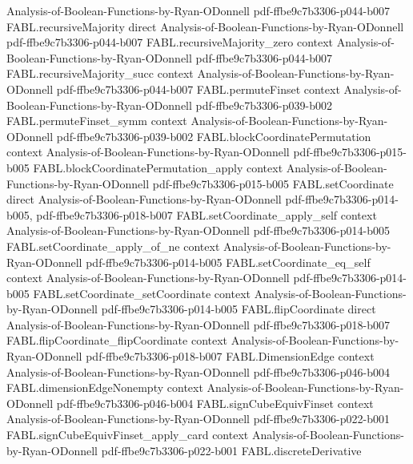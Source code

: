 \begin{theorem}
  {Analysis-of-Boolean-Functions-by-Ryan-ODonnell}
  {pdf-ffbe9c7b3306-p044-b007}
\proofstep
  {FABL.recursiveMajority}
  {direct}
  {Analysis-of-Boolean-Functions-by-Ryan-ODonnell}
  {pdf-ffbe9c7b3306-p044-b007}
\proofstep
  {FABL.recursiveMajority_zero}
  {context}
  {Analysis-of-Boolean-Functions-by-Ryan-ODonnell}
  {pdf-ffbe9c7b3306-p044-b007}
\proofstep
  {FABL.recursiveMajority_succ}
  {context}
  {Analysis-of-Boolean-Functions-by-Ryan-ODonnell}
  {pdf-ffbe9c7b3306-p044-b007}
\proofstep
  {FABL.permuteFinset}
  {context}
  {Analysis-of-Boolean-Functions-by-Ryan-ODonnell}
  {pdf-ffbe9c7b3306-p039-b002}
\proofstep
  {FABL.permuteFinset_symm}
  {context}
  {Analysis-of-Boolean-Functions-by-Ryan-ODonnell}
  {pdf-ffbe9c7b3306-p039-b002}
\proofstep
  {FABL.blockCoordinatePermutation}
  {context}
  {Analysis-of-Boolean-Functions-by-Ryan-ODonnell}
  {pdf-ffbe9c7b3306-p015-b005}
\proofstep
  {FABL.blockCoordinatePermutation_apply}
  {context}
  {Analysis-of-Boolean-Functions-by-Ryan-ODonnell}
  {pdf-ffbe9c7b3306-p015-b005}
\proofstep
  {FABL.setCoordinate}
  {direct}
  {Analysis-of-Boolean-Functions-by-Ryan-ODonnell}
  {pdf-ffbe9c7b3306-p014-b005,
    pdf-ffbe9c7b3306-p018-b007}
\proofstep
  {FABL.setCoordinate_apply_self}
  {context}
  {Analysis-of-Boolean-Functions-by-Ryan-ODonnell}
  {pdf-ffbe9c7b3306-p014-b005}
\proofstep
  {FABL.setCoordinate_apply_of_ne}
  {context}
  {Analysis-of-Boolean-Functions-by-Ryan-ODonnell}
  {pdf-ffbe9c7b3306-p014-b005}
\proofstep
  {FABL.setCoordinate_eq_self}
  {context}
  {Analysis-of-Boolean-Functions-by-Ryan-ODonnell}
  {pdf-ffbe9c7b3306-p014-b005}
\proofstep
  {FABL.setCoordinate_setCoordinate}
  {context}
  {Analysis-of-Boolean-Functions-by-Ryan-ODonnell}
  {pdf-ffbe9c7b3306-p014-b005}
\proofstep
  {FABL.flipCoordinate}
  {direct}
  {Analysis-of-Boolean-Functions-by-Ryan-ODonnell}
  {pdf-ffbe9c7b3306-p018-b007}
\proofstep
  {FABL.flipCoordinate_flipCoordinate}
  {context}
  {Analysis-of-Boolean-Functions-by-Ryan-ODonnell}
  {pdf-ffbe9c7b3306-p018-b007}
\proofstep
  {FABL.DimensionEdge}
  {context}
  {Analysis-of-Boolean-Functions-by-Ryan-ODonnell}
  {pdf-ffbe9c7b3306-p046-b004}
\proofstep
  {FABL.dimensionEdgeNonempty}
  {context}
  {Analysis-of-Boolean-Functions-by-Ryan-ODonnell}
  {pdf-ffbe9c7b3306-p046-b004}
\proofstep
  {FABL.signCubeEquivFinset}
  {context}
  {Analysis-of-Boolean-Functions-by-Ryan-ODonnell}
  {pdf-ffbe9c7b3306-p022-b001}
\proofstep
  {FABL.signCubeEquivFinset_apply_card}
  {context}
  {Analysis-of-Boolean-Functions-by-Ryan-ODonnell}
  {pdf-ffbe9c7b3306-p022-b001}
\proofstep
  {FABL.discreteDerivative}

\end{theorem}
